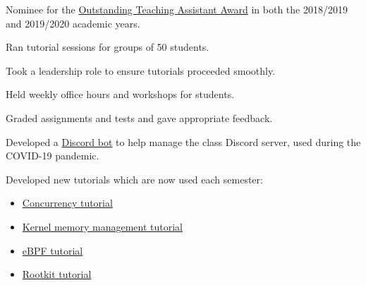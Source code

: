 \begin{cventries}
{\begin{cvitems}
        \item Nominee for the \href{https://carleton.ca/tasupport/taawards/edc-outstanding-ta-awards/}
            {Outstanding Teaching Assistant Award} in both the 2018/2019 and 2019/2020 academic years.
        \item Ran tutorial sessions for groups of 50 students.
        \item Took a leadership role to ensure tutorials proceeded smoothly.
        \item Held weekly office hours and workshops for students.
        \item Graded assignments and tests and gave appropriate feedback.
        \item Developed a \href{https://github.com/willfindlay/tabot}{Discord bot} to help manage the class Discord server, used during the COVID-19 pandemic.
        \item Developed new tutorials which are now used each semester:
          \begin{itemize}
            \item \href{https://homeostasis.scs.carleton.ca/wiki/index.php/Operating_Systems_2020W:_Tutorial_6}
              {Concurrency tutorial}
            \item \href{https://homeostasis.scs.carleton.ca/wiki/index.php/Operating_Systems_2020W:_Tutorial_8}
              {Kernel memory management tutorial}
            \item \href{https://homeostasis.scs.carleton.ca/wiki/index.php/Operating_Systems_2020W:_Tutorial_9}
              {eBPF tutorial}
            \item \href{https://homeostasis.scs.carleton.ca/wiki/index.php/Operating_Systems_2019F:_Tutorial_9}
              {Rootkit tutorial}
          \end{itemize}
      \end{cvitems}
    }

\end{cventries}
